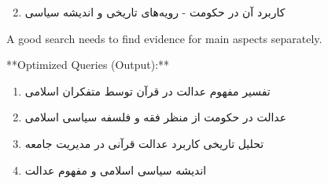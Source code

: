 \documentclass[11pt]{article}
\newcommand{\fa}[1]{\textfarsi{#1}}
\begin{document}
\begin{PromptBlock}
\end{PromptBlock}

\begin{enumerate}
\setcounter{enumi}{1}
\item \fa{کاربرد آن در حکومت - رویه‌های تاریخی و اندیشه سیاسی}
\end{enumerate}

\begin{PromptBlock}

A good search needs to find evidence for main aspects separately.

**Optimized Queries (Output):**
\end{PromptBlock}

\begin{enumerate}
\item \fa{تفسیر مفهوم عدالت در قرآن توسط متفکران اسلامی}
\end{enumerate}

\begin{PromptBlock}
\end{PromptBlock}

\begin{enumerate}
\setcounter{enumi}{1}
\item \fa{عدالت در حکومت از منظر فقه و فلسفه سیاسی اسلامی}
\end{enumerate}

\begin{PromptBlock}
\end{PromptBlock}

\begin{enumerate}
\setcounter{enumi}{2}
\item \fa{تحلیل تاریخی کاربرد عدالت قرآنی در مدیریت جامعه}
\end{enumerate}

\begin{PromptBlock}
\end{PromptBlock}

\begin{enumerate}
\setcounter{enumi}{3}
\item \fa{اندیشه سیاسی اسلامی و مفهوم عدالت}
\end{enumerate}
\end{document}
